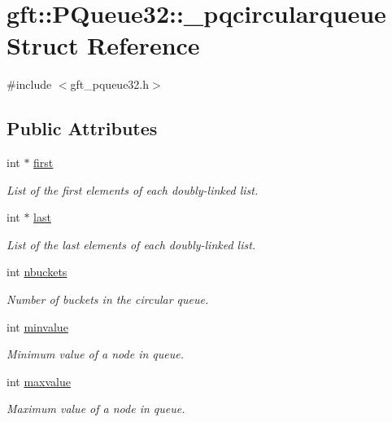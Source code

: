 \hypertarget{structgft_1_1PQueue32_1_1__pqcircularqueue}{\section{gft\-:\-:P\-Queue32\-:\-:\-\_\-pqcircularqueue Struct Reference}
\label{structgft_1_1PQueue32_1_1__pqcircularqueue}
}


{\ttfamily \#include $<$gft\-\_\-pqueue32.\-h$>$}

\subsection*{Public Attributes}
\begin{DoxyCompactItemize}
\item 
int $\ast$ \hyperlink{structgft_1_1PQueue32_1_1__pqcircularqueue_abdbbf105caf80766f51fbc271d794ccb}{first}
\begin{DoxyCompactList}\small\item\em List of the first elements of each doubly-\/linked list. \end{DoxyCompactList}\item 
int $\ast$ \hyperlink{structgft_1_1PQueue32_1_1__pqcircularqueue_a9d495d213b910328120e4ed127dcbaec}{last}
\begin{DoxyCompactList}\small\item\em List of the last elements of each doubly-\/linked list. \end{DoxyCompactList}\item 
int \hyperlink{structgft_1_1PQueue32_1_1__pqcircularqueue_a622d6ecf851ae51f149bfd4cb8ba66e3}{nbuckets}
\begin{DoxyCompactList}\small\item\em Number of buckets in the circular queue. \end{DoxyCompactList}\item 
int \hyperlink{structgft_1_1PQueue32_1_1__pqcircularqueue_a98c5d1ecaf33142d7eac03f97485d4d7}{minvalue}
\begin{DoxyCompactList}\small\item\em Minimum value of a node in queue. \end{DoxyCompactList}\item 
int \hyperlink{structgft_1_1PQueue32_1_1__pqcircularqueue_a48f348ed1f639dd4970aa5f35feb81e0}{maxvalue}
\begin{DoxyCompactList}\small\item\em Maximum value of a node in queue. \end{DoxyCompactList}\end{DoxyCompactItemize}


